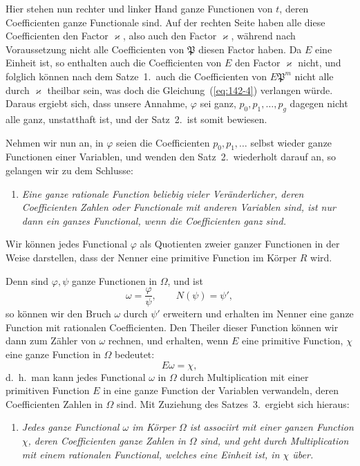 \documentclass[12pt,a4paper]{article}
\theoremstyle{definition}
\begin{document}
\newpage

Hier stehen nun rechter und linker Hand ganze Functionen von $t$, deren Coefficienten ganze Functionale sind. Auf der rechten Seite haben alle diese Coefficienten den Factor $\varkappa$, also auch den Factor $\varkappa$, während nach Voraussetzung nicht alle Coefficienten von $\mathfrak{P}$ diesen Factor haben. Da $E$ eine Einheit ist, so enthalten auch die Coefficienten von $E$ den Factor $\varkappa$ nicht, und folglich können nach dem Satze~1.\ auch die Coefficienten von $E\mathfrak{P}^m$ nicht alle durch $\varkappa$ theilbar sein, was doch die Gleichung~(\ref{eq:142-4}) verlangen würde. Daraus ergiebt sich, dass unsere Annahme, $\varphi$ sei ganz, $p_0,p_1,\dots,p_g$ dagegen nicht alle ganz, unstatthaft ist, und der Satz~2.\ ist somit bewiesen.

Nehmen wir nun an, in $\varphi$ seien die Coefficienten $p_0,p_1,\dots$ selbst wieder ganze Functionen einer Variablen, und wenden den Satz~2.\ wiederholt darauf an, so gelangen wir zu dem Schlusse:

\begin{enumerate}[label=\arabic*., resume]
\item \textit{Eine ganze rationale Function beliebig vieler Veränderlicher, deren Coefficienten Zahlen oder Functionale mit anderen Variablen sind, ist nur dann ein ganzes Functional, wenn die Coefficienten ganz sind.}
\end{enumerate}

Wir können jedes Functional $\varphi$ als Quotienten zweier ganzer Functionen in der Weise darstellen, dass der Nenner eine primitive Function im Körper $R$ wird.

Denn sind $\varphi,\psi$ ganze Functionen in $\Omega$, und ist
\[
\omega = \frac{\varphi}{\psi},\qquad N(\psi) = \psi',
\]
so können wir den Bruch $\omega$ durch $\psi'$ erweitern und erhalten im Nenner eine ganze Function mit rationalen Coefficienten. Den Theiler dieser Function können wir dann zum Zähler von $\omega$ rechnen, und erhalten, wenn $E$ eine primitive Function, $\chi$ eine ganze Function in $\Omega$ bedeutet:
\[
E\omega = \chi,
\]
d.~h.\ man kann jedes Functional $\omega$ in $\Omega$ durch Multiplication mit einer primitiven Function $E$ in eine ganze Function der Variablen verwandeln, deren Coefficienten Zahlen in $\Omega$ sind. Mit Zuziehung des Satzes~3.\ ergiebt sich hieraus:

\begin{enumerate}[label=\arabic*., resume]
\item \textit{Jedes ganze Functional $\omega$ im Körper $\Omega$ ist associirt mit einer ganzen Function $\chi$, deren Coefficienten ganze Zahlen in $\Omega$ sind, und geht durch Multiplication mit einem rationalen Functional, welches eine Einheit ist, in $\chi$ über.}
\end{enumerate}
\end{document}
